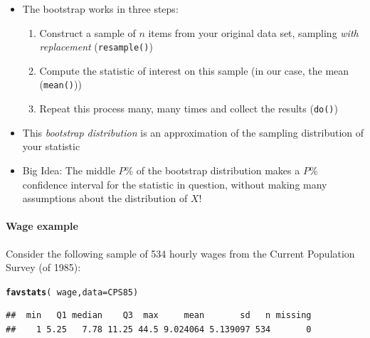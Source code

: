 \documentclass[10pt]{article}\usepackage[]{graphicx}\usepackage[]{color}
\makeatletter
\newcommand{\hlopt}[1]{\textcolor[rgb]{0,0,0}{#1}}%
\newcommand{\hlstd}[1]{\textcolor[rgb]{0.345,0.345,0.345}{#1}}%
\newcommand{\hlkwc}[1]{\textcolor[rgb]{0.333,0.667,0.333}{#1}}%
\newcommand{\hlkwd}[1]{\textcolor[rgb]{0.737,0.353,0.396}{\textbf{#1}}}%
\newenvironment{kframe}{%
 \def\at@end@of@kframe{}%
 \ifinner\ifhmode%
  \def\at@end@of@kframe{\end{minipage}}%
  \begin{minipage}{\columnwidth}%
 \fi\fi%
 \def\FrameCommand##1{\hskip\@totalleftmargin \hskip-\fboxsep
 \colorbox{shadecolor}{##1}\hskip-\fboxsep
     \hskip-\linewidth \hskip-\@totalleftmargin \hskip\columnwidth}%
 \MakeFramed {\advance\hsize-\width
   \@totalleftmargin\z@ \linewidth\hsize
   \@setminipage}}%
 {\par\unskip\endMakeFramed%
 \at@end@of@kframe}
\newenvironment{knitrout}{}{} %
\makeatother
\begin{document}
  \begin{itemize}
  \item The bootstrap works in three steps:
  \begin{enumerate}
    \item Construct a sample of $n$ items from your original data set, sampling \emph{with replacement} ({\tt resample()})
    \item Compute the statistic of interest on this sample (in our case, the mean ({\tt mean()}))
    \item Repeat this process many, many times and collect the results ({\tt do()})
  \end{enumerate}
  \item This \emph{bootstrap distribution} is an approximation of the sampling distribution of your statistic
  \item Big Idea: The middle $P$\% of the bootstrap distribution makes a $P$\% confidence interval for the statistic in question, without making many assumptions about the distribution of $X$!
\end{itemize}

\paragraph{Wage example}

Consider the following sample of 534 hourly wages from the Current Population Survey (of 1985): 

\begin{knitrout}\footnotesize
{}\color{fgcolor}\begin{kframe}
\begin{alltt}
\hlkwd{favstats}\hlstd{(}\hlopt{~}\hlstd{wage,} \hlkwc{data} \hlstd{= CPS85)}
\end{alltt}
\begin{verbatim}
##  min   Q1 median    Q3  max     mean       sd   n missing
##    1 5.25   7.78 11.25 44.5 9.024064 5.139097 534       0
\end{verbatim}
\end{kframe}
\end{knitrout}
\end{document}
